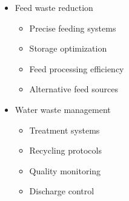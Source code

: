 \begin{itemize}
\begin{itemize}
        \item Feed waste reduction
        \begin{itemize}
            \item Precise feeding systems
            \item Storage optimization
            \item Feed processing efficiency
            \item Alternative feed sources
        \end{itemize}
        
        \item Water waste management
        \begin{itemize}
            \item Treatment systems
            \item Recycling protocols
            \item Quality monitoring
            \item Discharge control
        \end{itemize}
    \end{itemize}
\end{itemize}

